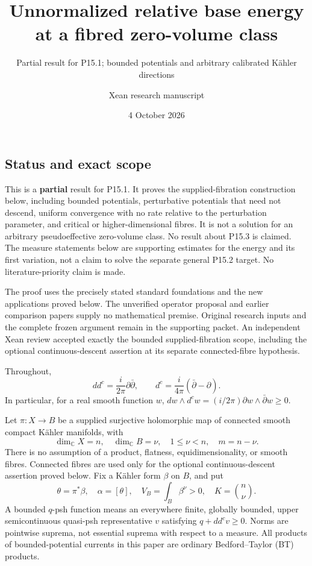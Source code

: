 \documentclass[
  11pt,
]{article}
\title{Unnormalized relative base energy at a fibred zero-volume class}
\subtitle{Partial result for P15.1; bounded potentials and arbitrary
calibrated Kähler directions}
\author{Xean research manuscript}
\date{4 October 2026}
\begin{document}
\maketitle

\subsection{Status and exact scope}\label{status-and-exact-scope}

This is a \textbf{partial} result for P15.1. It proves the
supplied-fibration construction below, including bounded potentials,
perturbative potentials that need not descend, uniform convergence with
no rate relative to the perturbation parameter, and critical or
higher-dimensional fibres. It is not a solution for an arbitrary
pseudoeffective zero-volume class. No result about P15.3 is claimed. The
measure statements below are supporting estimates for the energy and its
first variation, not a claim to solve the separate general P15.2 target.
No literature-priority claim is made.

The proof uses the precisely stated standard foundations and the new
applications proved below. The unverified operator proposal and earlier
comparison papers supply no mathematical premise. Original research
inputs and the complete frozen argument remain in the supporting packet.
An independent Xean review accepted exactly the bounded supplied-fibration
scope, including the optional continuous-descent assertion at its separate
connected-fibre hypothesis.

Throughout, \[dd^c=\frac{i}{2\pi}\partial\bar\partial,
\qquad d^c=\frac{i}{4\pi}(\bar\partial-\partial).\] In particular, for a
real smooth function \(w\),
\(dw\wedge d^cw=(i/2\pi)\partial w\wedge\bar\partial w\geq0\).

Let \(\pi:X\longrightarrow B\) be a supplied surjective holomorphic map
of connected smooth compact Kähler manifolds, with
\[\dim_{\mathbb{C}}X=n,\quad\dim_{\mathbb{C}}B=\nu,
\quad 1\leq\nu<n,\quad m=n-\nu.\] There is no assumption of a product,
flatness, equidimensionality, or smooth fibres. Connected fibres are
used only for the optional continuous-descent assertion proved below.
Fix a Kähler form \(\beta\) on \(B\), and put
\[\theta=\pi^*\beta,\quad \alpha=[\theta],\quad
V_B=\int_B\beta^\nu>0,\quad K=\binom n\nu.\] A bounded \(q\)-psh
function means an everywhere finite, globally bounded, upper
semicontinuous quasi-psh representative \(v\) satisfying
\(q+dd^cv\geq0\). Norms are pointwise suprema, not essential suprema
with respect to a measure. All products of bounded-potential currents in
this paper are ordinary Bedford--Taylor (BT) products.
\end{document}
